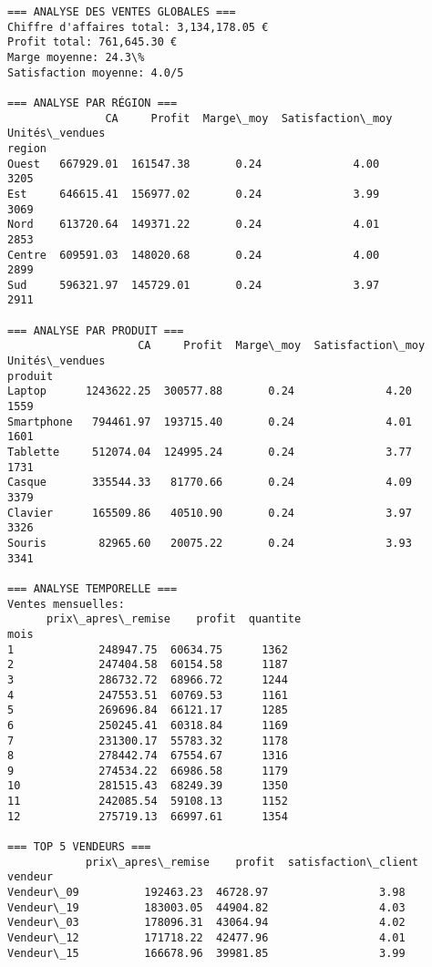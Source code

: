 \documentclass[11pt]{article}
\begin{document}
    \begin{Verbatim}[commandchars=\\\{\}]
=== ANALYSE DES VENTES GLOBALES ===
Chiffre d'affaires total: 3,134,178.05 €
Profit total: 761,645.30 €
Marge moyenne: 24.3\%
Satisfaction moyenne: 4.0/5

=== ANALYSE PAR RÉGION ===
               CA     Profit  Marge\_moy  Satisfaction\_moy  Unités\_vendues
region
Ouest   667929.01  161547.38       0.24              4.00            3205
Est     646615.41  156977.02       0.24              3.99            3069
Nord    613720.64  149371.22       0.24              4.01            2853
Centre  609591.03  148020.68       0.24              4.00            2899
Sud     596321.97  145729.01       0.24              3.97            2911

=== ANALYSE PAR PRODUIT ===
                    CA     Profit  Marge\_moy  Satisfaction\_moy  Unités\_vendues
produit
Laptop      1243622.25  300577.88       0.24              4.20            1559
Smartphone   794461.97  193715.40       0.24              4.01            1601
Tablette     512074.04  124995.24       0.24              3.77            1731
Casque       335544.33   81770.66       0.24              4.09            3379
Clavier      165509.86   40510.90       0.24              3.97            3326
Souris        82965.60   20075.22       0.24              3.93            3341

=== ANALYSE TEMPORELLE ===
Ventes mensuelles:
      prix\_apres\_remise    profit  quantite
mois
1             248947.75  60634.75      1362
2             247404.58  60154.58      1187
3             286732.72  68966.72      1244
4             247553.51  60769.53      1161
5             269696.84  66121.17      1285
6             250245.41  60318.84      1169
7             231300.17  55783.32      1178
8             278442.74  67554.67      1316
9             274534.22  66986.58      1179
10            281515.43  68249.39      1350
11            242085.54  59108.13      1152
12            275719.13  66997.61      1354

=== TOP 5 VENDEURS ===
            prix\_apres\_remise    profit  satisfaction\_client
vendeur
Vendeur\_09          192463.23  46728.97                 3.98
Vendeur\_19          183003.05  44904.82                 4.03
Vendeur\_03          178096.31  43064.94                 4.02
Vendeur\_12          171718.22  42477.96                 4.01
Vendeur\_15          166678.96  39981.85                 3.99
    \end{Verbatim}
\end{document}
